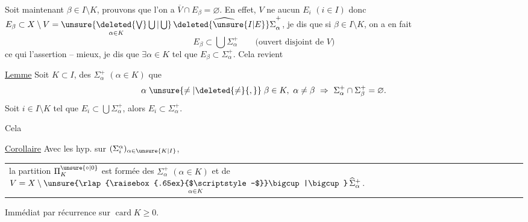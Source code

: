 Soit maintenant $\beta\in I\setminus K$, prouvons que l'on a $\overline V\cap E_\beta=\varnothing$. En effet, $V$ ne   aucun $E_i$ $(i\in I)$ donc $E_\beta\subset X\setminus V=\mathop{\unsure{\deleted{\bigvee}\bigcup|\bigcup}}\limits_{\alpha\in K}\widehat{\deleted{\unsure{I|E}}\Sigma}_\alpha^+$,  je dis que si $\beta\in I\setminus K$, on a en fait
\[
E_\beta\subset\bigcup\Sigma_\alpha^+\qquad\text{(ouvert disjoint de }V\text{)}
\]
\reversemarginpar{}\normalmarginpar
ce qui  l'assertion -- mieux, je dis que $\exists\alpha\in K$ tel que $E_\beta\subset\Sigma_\alpha^+$. Cela revient 

\uline{Lemme} Soit $K\subset I$,   des $\Sigma_\alpha^+$ $(\alpha\in K)$  que
\[
\alpha\mathrel{\unsure{\ne|\deleted{\ne}{,}}}\beta\in K,\ \alpha\ne\beta\ \Rightarrow\ \Sigma_\alpha^+\cap\Sigma_\beta^+=\varnothing.
\]
Soit $i\in I\setminus K$ tel que $E_i\subset\bigcup\Sigma_\alpha^+$, alors   $E_i\subset\Sigma_\alpha^+$.

Cela   

\uline{Corollaire} Avec les hyp.  sur $(\Sigma_i^\alpha)_{\alpha\in\unsure{K|I}}$,

\noindent\begin{tabular}{@{}|p{.96\linewidth}@{}}
la partition $\Pi_K^{\unsure{\circ|0}}$ est formée des $\Sigma_\alpha^+$ $(\alpha\in K)$ et de $V=X\setminus\mathop{\unsure{\rlap{\raisebox{.65ex}{$\scriptstyle-$}}\bigcup|\bigcup}}\limits_{\alpha\in K}\widehat{\Sigma}_\alpha^+$.
\end{tabular}

Immédiat par récurrence sur $\operatorname{card} K\geq 0$.
